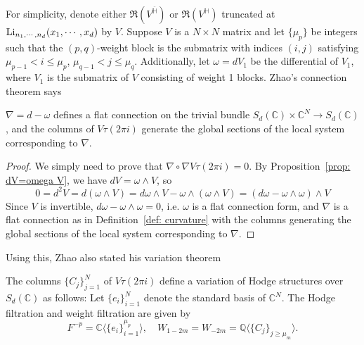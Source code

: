 For simplicity, denote either $\Re(V^{\overline{\mathbb H}})$ or $\Re(V^{\mathbb H})$ truncated at $\operatorname{Li}_{n_1,\cdots,n_d}(x_1,\cdots,x_d)$ by $V$. Suppose $V$ is a $N\times N$ matrix and let $\{\mu_p\}$ be integers such that the $(p,q)$-weight block is the submatrix with indices $(i,j)$ satisfying $\mu_{p-1}<i\leq\mu_p$, $\mu_{q-1}<j\leq\mu_q$. Additionally, let $\omega=dV_1$ be the differential of $V_1$, where $V_1$ is the submatrix of $V$ consisting of weight 1 blocks. Zhao's connection theorem says

\begin{theorem}\cite{Zhao_MultipleZetaFunctionsMultiplePolylogarithmsAndTheirSpecialValues}\label{thm: Zhao's connection}
$\nabla=d-\omega$ defines a flat connection on the trivial bundle $S_d(\mathbb C)\times\mathbb C^N\to S_d(\mathbb C)$, and the columns of $V\tau(2\pi i)$ generate the global sections of the local system corresponding to $\nabla$.
\end{theorem}

\begin{proof}
We simply need to prove that $\nabla\circ\nabla V\tau(2\pi i)=0$. By Proposition~\ref{prop: dV=omega V}, we have $dV=\omega\wedge V$, so
\[
0=d^2V=d(\omega\wedge V)=d\omega\wedge V-\omega\wedge(\omega\wedge V)=(d\omega-\omega\wedge\omega)\wedge V
\]
Since $V$ is invertible, $d\omega-\omega\wedge\omega=0$, i.e. $\omega$ is a flat connection form, and $\nabla$ is a flat connection as in Definition~\ref{def: curvature} with the columns generating the global sections of the local system corresponding to $\nabla$.
\end{proof}

Using this, Zhao also stated his variation theorem

\begin{theorem}\label{thm: Zhao's variation thm}\cite{Zhao_MultipleZetaFunctionsMultiplePolylogarithmsAndTheirSpecialValues}
The columns $\{C_j\}_{j=1}^N$ of $V\tau(2\pi i)$ define a variation of Hodge structures over $S_d(\mathbb C)$ as follows: Let $\{e_i\}_{i=1}^N$ denote the standard basis of $\mathbb C^N$. The Hodge filtration and weight filtration are given by
\begin{equation}
F^{-p}=\mathbb C\langle\{e_i\}_{i=1}^{\mu_p}\rangle,\quad W_{1-2m}=W_{-2m}=\mathbb Q\langle\{C_j\}_{j\geq \mu_m}\rangle.
\end{equation}
\end{theorem}

